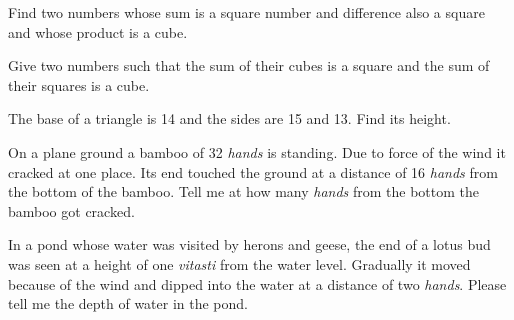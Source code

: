 \documentclass[]{article}
\begin{document}
{{Find two numbers whose sum is a square number and difference also a
square and whose product is a cube. }

\begin{quote}  {
}  \end{quote}

{Give two numbers such that the sum of their cubes is a square and the
sum of their squares is a cube.}

\begin{quote}  {
}  \end{quote}

{The base of a triangle is 14 and the sides are 15 and 13. Find its
height.}

\begin{quote}  {
}  \end{quote}
\newpage
\large

{On a plane ground a bamboo of 32 \textit{hands} is standing. Due to force of the
wind it cracked at one place. Its end touched the ground at a distance
of 16 \textit{hands} from the bottom of the bamboo. Tell me at how many \textit{hands}
from the bottom the bamboo got cracked.}

\begin{quote}  {
}  \end{quote}

{In a pond whose water was visited by herons and geese, the end of a
lotus bud was seen at a height of one \textit{vitasti} from the water level.
Gradually it moved because of the wind and dipped into the water at a
distance of two \textit{hands}. Please tell me the depth of water in the pond.}

}
\end{document}

